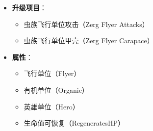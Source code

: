 \begin{tcolorbox}[colback=white, colframe=black!60!white, title=Hero\_Kukulza\_Guardian(), arc=0mm]
\begin{itemize}
        \item \textbf{升级项目}：
            \begin{itemize}
                \item 虫族飞行单位攻击（Zerg Flyer Attacks）
                \item 虫族飞行单位甲壳（Zerg Flyer Carapace）
            \end{itemize}
        \item \textbf{属性}：
            \begin{itemize}
                \item 飞行单位（Flyer）
                \item 有机单位（Organic）
                \item 英雄单位（Hero）
                \item 生命值可恢复（RegeneratesHP）
            \end{itemize}
    \end{itemize}
\end{tcolorbox}


